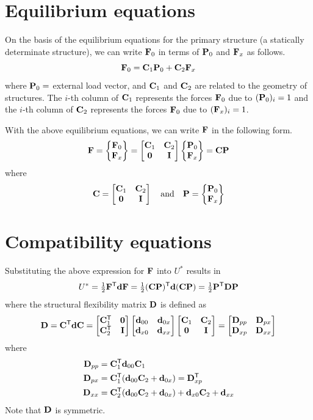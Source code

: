 \section{Equilibrium equations}
On the basis of the equilibrium equations for the primary structure (a statically determinate structure), we can write $\mathbf{F}_0$ in terms of $\mathbf{P}_0$ and $\mathbf{F}_x$ as follows.
\begin{equation}
  \mathbf{F}_0 = \mathbf{C}_1\mathbf{P}_0 + \mathbf{C}_2\mathbf{F}_x
\end{equation}
where $\mathbf{P}_0 =$ external load vector, and $\mathbf{C}_1$ and $\mathbf{C}_2$ are related to the geometry of structures. The $i$-th column of $\mathbf{C}_1$ represents the forces $\mathbf{F}_0$ due to $(\mathbf{P}_0)_i = 1$ and the $i$-th column of $\mathbf{C}_2$ represents the forces $\mathbf{F}_0$ due to $(\mathbf{F}_x)_i = 1$.

With the above equilibrium equations, we can write $\mathbf{F}$ in the following form.
\begin{equation}
  \mathbf{F} = \begin{Bmatrix}\mathbf{F}_0\\ \mathbf{F}_x\end{Bmatrix} = \begin{bmatrix}\mathbf{C}_1 & \mathbf{C}_2\\ \mathbf{0} & \mathbf{I}\end{bmatrix}\begin{Bmatrix}\mathbf{P}_0\\ \mathbf{F}_x\end{Bmatrix} = \mathbf{C}\mathbf{P}
\end{equation}
where
\begin{equation}
  \mathbf{C} = \begin{bmatrix}\mathbf{C}_1 & \mathbf{C}_2\\ \mathbf{0} & \mathbf{I}\end{bmatrix}\quad\text{and}\quad \mathbf{P} = \begin{Bmatrix}\mathbf{P}_0\\ \mathbf{F}_x\end{Bmatrix}
\end{equation}

\section{Compatibility equations}
Substituting the above expression for $\mathbf{F}$ into $U^*$ results in
\begin{equation}
  U^* = \tfrac12\mathbf{F}^{\mathsf{T}}\mathbf{d}\mathbf{F} = \tfrac12(\mathbf{C}\mathbf{P})^{\mathsf{T}}\mathbf{d}(\mathbf{C}\mathbf{P}) = \tfrac12\mathbf{P}^{\mathsf{T}}\mathbf{D}\mathbf{P}
\end{equation}
where the structural flexibility matrix $\mathbf{D}$ is defined as
\begin{equation}
  \mathbf{D} = \mathbf{C}^{\mathsf{T}}\mathbf{d}\mathbf{C} = \begin{bmatrix}\mathbf{C}_1^{\mathsf{T}} & \mathbf{0}\\ \mathbf{C}_2^{\mathsf{T}} & \mathbf{I}\end{bmatrix}\begin{bmatrix}\mathbf{d}_{00} & \mathbf{d}_{0x}\\ \mathbf{d}_{x0} & \mathbf{d}_{xx}\end{bmatrix}\begin{bmatrix}\mathbf{C}_1 & \mathbf{C}_2\\ \mathbf{0} & \mathbf{I}\end{bmatrix} = \begin{bmatrix}\mathbf{D}_{pp} & \mathbf{D}_{px}\\ \mathbf{D}_{xp} & \mathbf{D}_{xx}\end{bmatrix}
\end{equation}
where
\begin{align}
  \mathbf{D}_{pp} &= \mathbf{C}_1^{\mathsf{T}}\mathbf{d}_{00}\mathbf{C}_1\\
  \mathbf{D}_{px} &= \mathbf{C}_1^{\mathsf{T}}(\mathbf{d}_{00}\mathbf{C}_2 + \mathbf{d}_{0x}) = \mathbf{D}_{xp}^{\mathsf{T}}\\
  \mathbf{D}_{xx} &= \mathbf{C}_2^{\mathsf{T}}(\mathbf{d}_{00}\mathbf{C}_2 + \mathbf{d}_{0x}) + \mathbf{d}_{x0}\mathbf{C}_2 + \mathbf{d}_{xx}
\end{align}
Note that $\mathbf{D}$ is symmetric.

